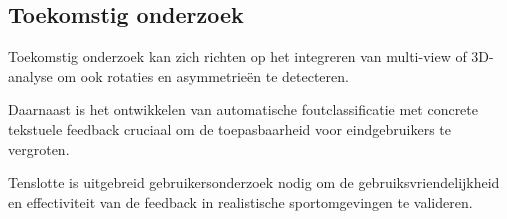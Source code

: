 \documentclass[a0,portrait]{hogent-poster}
\begin{document}
\begin{multicols}{2}
\section{Toekomstig onderzoek}

Toekomstig onderzoek kan zich richten op het integreren van multi-view of 3D-analyse om ook rotaties en asymmetrieën te detecteren. 

Daarnaast is het ontwikkelen van automatische foutclassificatie met concrete tekstuele feedback cruciaal om de toepasbaarheid voor eindgebruikers te vergroten. 

Tenslotte is uitgebreid gebruikersonderzoek nodig om de gebruiksvriendelijkheid en effectiviteit van de feedback in realistische sportomgevingen te valideren.

\end{multicols}
\end{document}
